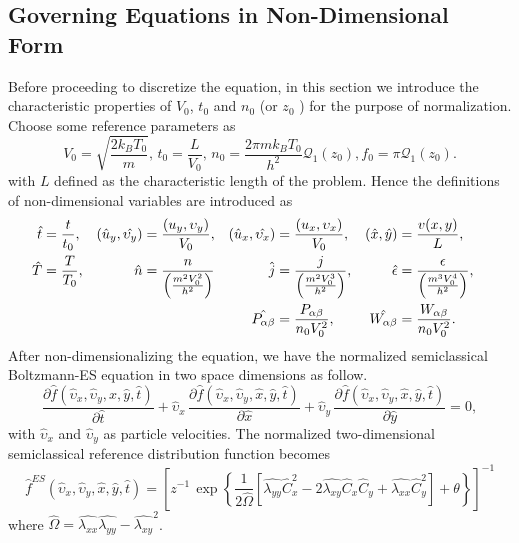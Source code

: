 \documentclass{rsproca}%
\begin{document}
\subsection{Governing Equations in Non-Dimensional Form}
\label{subsec:3_2}
Before proceeding to discretize the equation, in this section we introduce the characteristic properties of $V_0$, $t_0$ and $n_0$ (or $z_0$ ) for the purpose of normalization.  Choose some reference parameters as
\begin{equation}
V_0 = \sqrt{\frac{2k_B T_0}{m}}, \, t_0 = \frac{L}{V_0},\, n_{0} = \frac{2 \pi m k_B T_0}{h^2} \mathcal{Q}_1 (z_0), f_0=\pi \mathcal{Q}_1(z_0).
\end{equation}
with $L$ defined as the characteristic length of the problem. Hence the definitions of non-dimensional variables are introduced as
\begin{align}
\hat{t} &=\frac{t}{t_0},& (\hat{u}_y,\hat{\upsilon_y})&={(u_y,\upsilon_y)\over V_0},& 
(\hat{u}_x,\hat{\upsilon_x})&=\frac{(u_x,\upsilon_x)}{V_0},& (\hat{x},\hat{y})&=\frac{v(x, y)}{L},& \nonumber \\
\hat{T}&=\frac{T}{T_0},& \hat{n}&={n \over \left(\frac{m^2V_0^2}{h^2}\right)}& 
\hat{j}&={j \over \left(\frac{m^2V_{0}^3}{h^2}\right) },& \hat{\epsilon}&={\epsilon \over \left(\frac{m^3 V_{0}^4}{h^2}\right)},& \nonumber \\
& & & &\hat{P_{\alpha \beta}} &= { P_{\alpha \beta} \over n_{0} V_{0}^2 },& \hat{W_{\alpha \beta}} &= { W_{\alpha \beta} \over n_{0} V_0^2}.&
\end{align}
After non-dimensionalizing the equation, we have the normalized semiclassical Boltzmann-ES equation in two space dimensions as follow.
\begin{equation}
\frac{\partial\hat{f}(\hat{\upsilon}_x,\hat{\upsilon}_y,\hat{x},\hat{y},\hat{t})}{\partial\hat{t}} + \hat{\upsilon}_x\,\frac{\partial\hat{f}(\hat{\upsilon}_x,\hat{\upsilon}_y,\hat{x},\hat{y},\hat{t})}{\partial\hat{x}} + \hat{\upsilon}_y\,\frac{\partial\hat{f}(\hat{\upsilon}_x,\hat{\upsilon}_y,\hat{x},\hat{y},\hat{t})}{\partial\hat{y}} = 0, \label{normalizedes}
\end{equation}
with $\hat{\upsilon}_x$ and $\hat{\upsilon}_y$ as particle velocities. The normalized two-dimensional semiclassical reference distribution function becomes
\begin{equation}
\hat{f}^{ES}\left(\hat{\upsilon}_x,\hat{\upsilon}_y,\hat{x},\hat{y},\hat{t}\right) =
\left[ z^{-1}\,\exp\left\{ \frac{1}{2 \hat{\Omega}} \left[ \hat{\lambda_{yy}} \hat{C}_x^2 - 2 
\hat{\lambda_{xy}} \hat{C}_x \hat{C}_y + \hat{\lambda_{xx}} \hat{C}_y^2 \right] + \theta  \right\} \right]^{-1}
\end{equation}
where $\hat{\Omega} = \hat{\lambda_{xx}} \hat{ \lambda_{yy}} - \hat{\lambda_{xy}}^2$.
\end{document}

